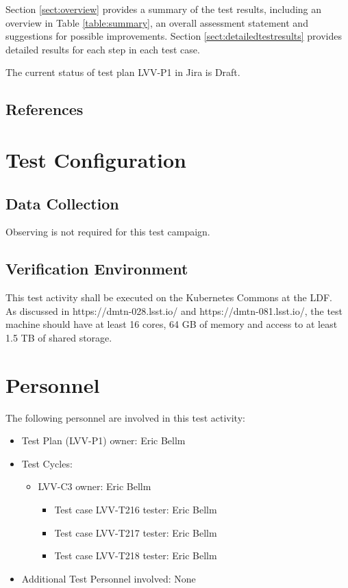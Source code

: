 \documentclass[DM,lsstdraft,STR,toc]{lsstdoc}
\begin{document}
Section \ref{sect:overview} provides a summary of the test results, including an overview in Table \ref{table:summary}, an overall assessment statement and suggestions for possible improvements.
Section \ref{sect:detailedtestresults} provides detailed results for each step in each test case.

The current status of test plan LVV-P1 in Jira is Draft.

\subsection{References}
\label{sect:references}
\renewcommand{\refname}{}

\section{Test Configuration}
\label{sect:configuration}

\subsection{Data Collection}

  Observing is not required for this test campaign.

\subsection{Verification Environment}
\label{sect:hwconf}
  This test activity shall be executed on the Kubernetes Commons at the
LDF.\\
As discussed in https://dmtn-028.lsst.io/ and https://dmtn-081.lsst.io/,
the test machine should have at least 16 cores, 64 GB of memory and
access to at least 1.5 TB of shared storage.





\section{Personnel}
\label{sect:personnel}

The following personnel are involved in this test activity:

\begin{itemize}
\item Test Plan (LVV-P1) owner: Eric Bellm
\item Test Cycles:
\begin{itemize}
  \item LVV-C3 owner: 
    Eric Bellm
  \begin{itemize}
    \item Test case LVV-T216 tester: Eric Bellm
    \item Test case LVV-T217 tester: Eric Bellm
    \item Test case LVV-T218 tester: Eric Bellm
  \end{itemize}
\end{itemize}
\item Additional Test Personnel involved: None
\end{itemize}
\end{document}
